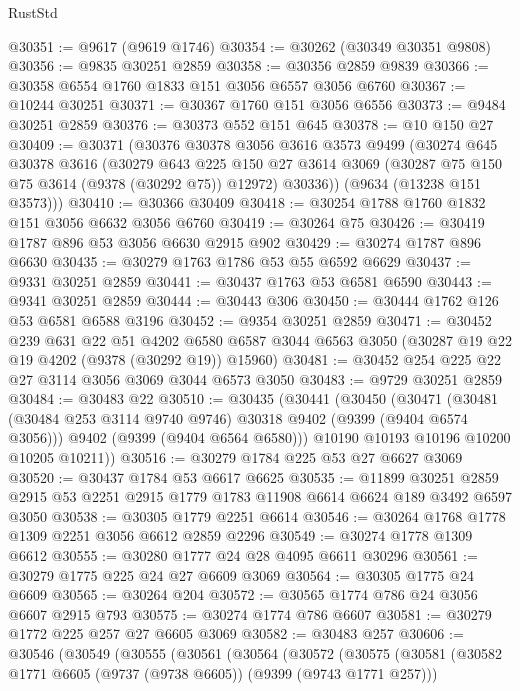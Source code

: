 \begin{lexlean}{RustStd}
\begin{coremodule}
@30351 := @9617 (@9619 @1746)
@30354 := @30262 (@30349 @30351 @9808)
@30356 := @9835 @30251 @2859
@30358 := @30356 @2859 @9839
@30366 := @30358 @6554 @1760 @1833 @151 @3056 @6557 @3056 @6760
@30367 := @10244 @30251
@30371 := @30367 @1760 @151 @3056 @6556
@30373 := @9484 @30251 @2859
@30376 := @30373 @552 @151 @645
@30378 := @10 @150 @27
@30409 := @30371
    (@30376
      @30378
      @3056
      @3616
      @3573
      @9499
      (@30274
        @645
        @30378
        @3616
        (@30279
          @643
          @225
          @150
          @27
          @3614
          @3069
          (@30287 @75 @150 @75 @3614 (@9378 (@30292 @75)) @12972)
          @30336))
      (@9634 (@13238 @151 @3573)))
@30410 := @30366 @30409
@30418 := @30254 @1788 @1760 @1832 @151 @3056 @6632 @3056 @6760
@30419 := @30264 @75
@30426 := @30419 @1787 @896 @53 @3056 @6630 @2915 @902
@30429 := @30274 @1787 @896 @6630
@30435 := @30279 @1763 @1786 @53 @55 @6592 @6629
@30437 := @9331 @30251 @2859
@30441 := @30437 @1763 @53 @6581 @6590
@30443 := @9341 @30251 @2859
@30444 := @30443 @306
@30450 := @30444 @1762 @126 @53 @6581 @6588 @3196
@30452 := @9354 @30251 @2859
@30471 := @30452
    @239
    @631
    @22
    @51
    @4202
    @6580
    @6587
    @3044
    @6563
    @3050
    (@30287 @19 @22 @19 @4202 (@9378 (@30292 @19)) @15960)
@30481 := @30452 @254 @225 @22 @27 @3114 @3056 @3069 @3044 @6573 @3050
@30483 := @9729 @30251 @2859
@30484 := @30483 @22
@30510 := @30435
    (@30441
      (@30450
        (@30471
          (@30481 (@30484 @253 @3114 @9740 @9746) @30318 @9402 (@9399 (@9404 @6574 @3056)))
          @9402
          (@9399 (@9404 @6564 @6580)))
        @10190
        @10193
        @10196
        @10200
        @10205
        @10211))
@30516 := @30279 @1784 @225 @53 @27 @6627 @3069
@30520 := @30437 @1784 @53 @6617 @6625
@30535 := @11899
    @30251
    @2859
    @2915
    @53
    @2251
    @2915
    @1779
    @1783
    @11908
    @6614
    @6624
    @189
    @3492
    @6597
    @3050
@30538 := @30305 @1779 @2251 @6614
@30546 := @30264 @1768 @1778 @1309 @2251 @3056 @6612 @2859 @2296
@30549 := @30274 @1778 @1309 @6612
@30555 := @30280 @1777 @24 @28 @4095 @6611 @30296
@30561 := @30279 @1775 @225 @24 @27 @6609 @3069
@30564 := @30305 @1775 @24 @6609
@30565 := @30264 @204
@30572 := @30565 @1774 @786 @24 @3056 @6607 @2915 @793
@30575 := @30274 @1774 @786 @6607
@30581 := @30279 @1772 @225 @257 @27 @6605 @3069
@30582 := @30483 @257
@30606 := @30546
    (@30549
      (@30555
        (@30561
          (@30564
            (@30572
              (@30575
                (@30581
                  (@30582 @1771 @6605 (@9737 (@9738 @6605)) (@9399 (@9743 @1771 @257)))

\end{coremodule}
\end{lexlean}
